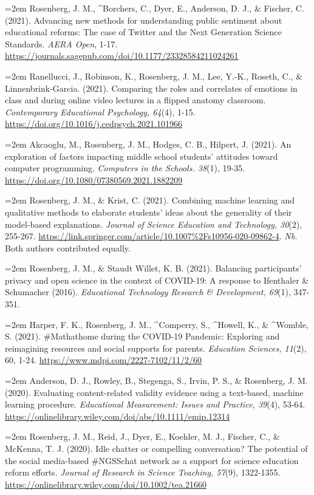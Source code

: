 \documentclass[
  14,
]{article}
\begin{document}
\hangindent=2em Rosenberg, J. M., \^{}Borchers, C., Dyer, E., Anderson,
D. J., \& Fischer, C. (2021). Advancing new methods for understanding
public sentiment about educational reforms: The case of Twitter and the
Next Generation Science Standards. \emph{AERA Open}, 1-17.
\url{https://journals.sagepub.com/doi/10.1177/23328584211024261}

\hangindent=2em Ranellucci, J., Robinson, K., Rosenberg, J. M., Lee,
Y.-K., Roseth, C., \& Linnenbrink-Garcia. (2021). Comparing the roles
and correlates of emotions in class and during online video lectures in
a flipped anatomy classroom. \emph{Contemporary Educational Psychology,
64}(4), 1-15. \url{https://doi.org/10.1016/j.cedpsych.2021.101966}

\hangindent=2em Akcaoglu, M., Rosenberg, J. M., Hodges, C. B., Hilpert,
J. (2021). An exploration of factors impacting middle school students'
attitudes toward computer programming. \emph{Computers in the Schools.
38}(1), 19-35. \url{https://doi.org/10.1080/07380569.2021.1882209}

\hangindent=2em Rosenberg, J. M., \& Krist, C. (2021). Combining machine
learning and qualitative methods to elaborate students' ideas about the
generality of their model-based explanations. \emph{Journal of Science
Education and Technology, 30}(2), 255-267.
\url{https://link.springer.com/article/10.1007\%2Fs10956-020-09862-4}.
\emph{Nb.} Both authors contributed equally.

\hangindent=2em Rosenberg, J. M., \& Staudt Willet, K. B. (2021).
Balancing participants' privacy and open science in the context of
COVID-19: A response to Ifenthaler \& Schumacher (2016).
\emph{Educational Technology Research \& Development, 69}(1), 347-351.

\hangindent=2em Harper, F. K., Rosenberg, J. M., \^{}Comperry, S.,
\^{}Howell, K., \& \^{}Womble, S. (2021). \#Mathathome during the
COVID-19 Pandemic: Exploring and reimagining resources and social
supports for parents. \emph{Education Sciences, 11}(2), 60, 1-24.
\url{https://www.mdpi.com/2227-7102/11/2/60}

\hangindent=2em Anderson, D. J., Rowley, B., Stegenga, S., Irvin, P. S.,
\& Rosenberg, J. M. (2020). Evaluating content-related validity evidence
using a text-based, machine learning procedure. \emph{Educational
Measurement: Issues and Practice, 39}(4), 53-64.
\url{https://onlinelibrary.wiley.com/doi/abs/10.1111/emip.12314}

\hangindent=2em Rosenberg, J. M., Reid, J., Dyer, E., Koehler, M. J.,
Fischer, C., \& McKenna, T. J. (2020). Idle chatter or compelling
conversation? The potential of the social media-based \#NGSSchat network
as a support for science education reform efforts. \emph{Journal of
Research in Science Teaching, 57}(9), 1322-1355.
\url{https://onlinelibrary.wiley.com/doi/10.1002/tea.21660}
\end{document}
